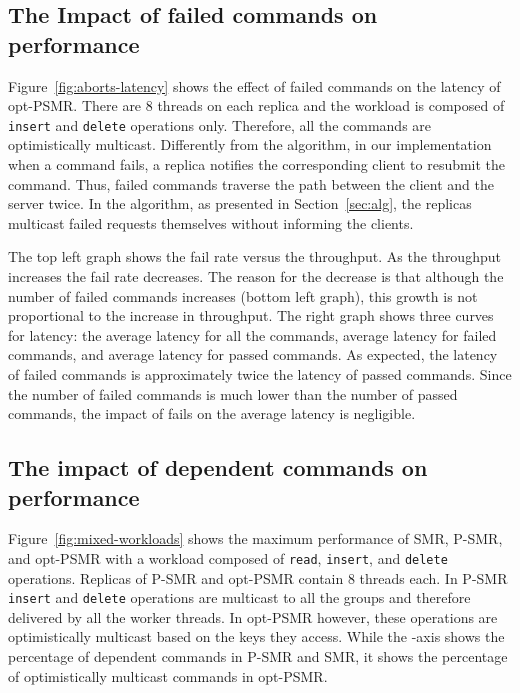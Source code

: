 \documentclass[conference]{IEEEtran}
\begin{document}
\subsection{The Impact of failed commands on performance}
\label{exp:aborts}


Figure~\ref{fig:aborts-latency} shows the effect of failed commands on the latency of opt-PSMR. 
There are 8 threads on each replica and the workload is composed of \texttt{insert} and \texttt{delete} operations only. 
Therefore, all the commands are optimistically multicast. 
Differently from the algorithm, in our implementation when a command fails, a replica notifies the corresponding client to resubmit the command. 
Thus, failed commands traverse the path between the client and the server twice. 
In the algorithm, as presented in Section~\ref{sec:alg}, the replicas multicast failed requests themselves without informing the clients.

The top left graph shows the fail rate versus the throughput. As the throughput increases the fail rate decreases. The reason for the decrease is that although the number of failed commands increases (bottom left graph), this growth is not proportional to the increase in throughput. The right graph shows three curves for latency: the average latency for all the commands, average latency for failed commands, and average latency for passed commands. As expected, the latency of failed commands is approximately twice the latency of passed commands. Since the number of failed commands is much lower than the number of passed commands, the impact of fails on the average latency is negligible. 



\subsection{The impact of dependent commands on performance}
\label{exp:mixed}


Figure~\ref{fig:mixed-workloads} shows the maximum performance of SMR, P-SMR, and opt-PSMR with a workload composed of \texttt{read}, \texttt{insert}, and \texttt{delete} operations. Replicas of P-SMR and opt-PSMR contain 8 threads each. In P-SMR \texttt{insert} and \texttt{delete} operations are multicast to all the groups and therefore delivered by all the worker threads. In opt-PSMR however, these operations are optimistically multicast based on the keys they access. While the -axis shows the percentage of dependent commands in P-SMR and SMR, it shows the percentage of optimistically multicast commands in opt-PSMR. 
\end{document}
